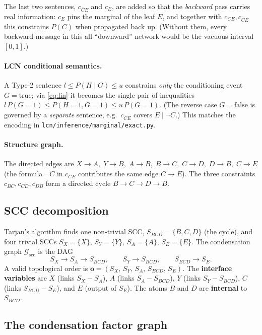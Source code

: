 \documentclass[11pt]{article}
\newcommand{\cG}{\mathcal{G}}
\newcommand{\scc}{\mathrm{scc}}
\begin{document}
\noindent The last two sentences, $c_{\bar C E}$ and $c_E$, are added so that the
\emph{backward} pass carries real information: $c_E$ pins the marginal of the
leaf $E$, and together with $c_{CE},c_{\bar C E}$ this constrains $P(C)$ when
propagated back up. (Without them, every backward message in this all-``downward''
network would be the vacuous interval $[0,1]$.)

\paragraph{LCN conditional semantics.}
A Type-2 sentence $l\le P(H\mid G)\le u$ constrains \emph{only} the conditioning
event $G{=}\text{true}$; via \eqref{eq:lin} it becomes the single pair of
inequalities $l\,P(G{=}1)\le P(H{=}1,G{=}1)\le u\,P(G{=}1)$. (The reverse case
$G{=}\text{false}$ is governed by a \emph{separate} sentence, e.g.\ $c_{\bar C E}$
covers $E\mid\neg C$.) This matches the encoding in
\texttt{lcn/inference/marginal/exact.py}.

\paragraph{Structure graph.}
The directed edges are
$X\!\to\!A,\;Y\!\to\!B,\;A\!\to\!B,\;B\!\to\!C,\;C\!\to\!D,\;D\!\to\!B,\;C\!\to\!E$
(the formula $\neg C$ in $c_{\bar C E}$ contributes the same edge $C\!\to\!E$).
The three constraints $c_{BC},c_{CD},c_{DB}$ form a directed cycle
$B\!\to\!C\!\to\!D\!\to\!B$.

\subsection{SCC decomposition}

Tarjan's algorithm finds one non-trivial SCC,
$S_{BCD}=\{B,C,D\}$ (the cycle), and four trivial SCCs
$S_X=\{X\},\,S_Y=\{Y\},\,S_A=\{A\},\,S_E=\{E\}$. The condensation graph
$\cG_{\scc}$ is the DAG
\[
  S_X \to S_A \to S_{BCD},\qquad
  S_Y \to S_{BCD},\qquad
  S_{BCD}\to S_E .
\]
A valid topological order is $\mathbf{o}=(S_X,\,S_Y,\,S_A,\,S_{BCD},\,S_E)$.
The \textbf{interface variables} are $X$ (links $S_X\!-\!S_A$), $A$ (links
$S_A\!-\!S_{BCD}$), $Y$ (links $S_Y\!-\!S_{BCD}$), $C$ (links
$S_{BCD}\!-\!S_E$), and $E$ (output of $S_E$). The atoms $B$ and $D$ are
\textbf{internal} to $S_{BCD}$.

\subsection{The condensation factor graph}
\end{document}
